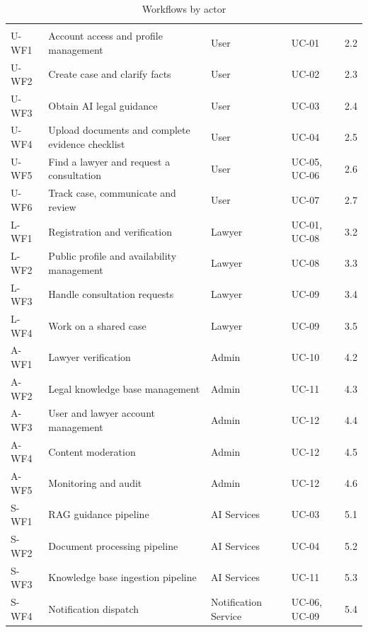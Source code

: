 \begin{longtable}{|L{1.70cm}|L{6.75cm}|L{1.70cm}|L{1.70cm}|L{1.70cm}|}
\caption{Workflows by actor}\label{tab:1.1}\\
\hline\headrow {} &  &  &  &  \\ \hline
\endfirsthead
\hline\headrow {} &  &  &  &  \\ \hline
\endhead
\hline\endlastfoot
U-WF1 & Account access and profile management & User & UC-01 & 2.2 \\ \hline
U-WF2 & Create case and clarify facts & User & UC-02 & 2.3 \\ \hline
U-WF3 & Obtain AI legal guidance & User & UC-03 & 2.4 \\ \hline
U-WF4 & Upload documents and complete evidence checklist & User & UC-04 & 2.5 \\ \hline
U-WF5 & Find a lawyer and request a consultation & User & UC-05, UC-06 & 2.6 \\ \hline
U-WF6 & Track case, communicate and review & User & UC-07 & 2.7 \\ \hline
L-WF1 & Registration and verification & Lawyer & UC-01, UC-08 & 3.2 \\ \hline
L-WF2 & Public profile and availability management & Lawyer & UC-08 & 3.3 \\ \hline
L-WF3 & Handle consultation requests & Lawyer & UC-09 & 3.4 \\ \hline
L-WF4 & Work on a shared case & Lawyer & UC-09 & 3.5 \\ \hline
A-WF1 & Lawyer verification & Admin & UC-10 & 4.2 \\ \hline
A-WF2 & Legal knowledge base management & Admin & UC-11 & 4.3 \\ \hline
A-WF3 & User and lawyer account management & Admin & UC-12 & 4.4 \\ \hline
A-WF4 & Content moderation & Admin & UC-12 & 4.5 \\ \hline
A-WF5 & Monitoring and audit & Admin & UC-12 & 4.6 \\ \hline
S-WF1 & RAG guidance pipeline & AI Services & UC-03 & 5.1 \\ \hline
S-WF2 & Document processing pipeline & AI Services & UC-04 & 5.2 \\ \hline
S-WF3 & Knowledge base ingestion pipeline & AI Services & UC-11 & 5.3 \\ \hline
S-WF4 & Notification dispatch & Notification Service & UC-06, UC-09 & 5.4 \\
\end{longtable}

